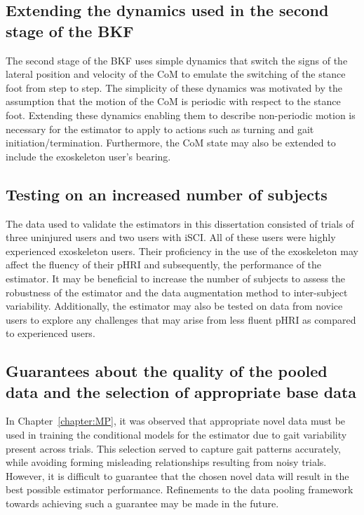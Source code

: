 \subsection{Extending the dynamics used in the second stage of the BKF}

The second stage of the BKF uses simple dynamics that switch the signs of the lateral position and velocity of the CoM to emulate the switching of the stance foot from step to step. The simplicity of these dynamics was motivated by the assumption that the motion of the CoM is periodic with respect to the stance foot. Extending these dynamics enabling them to describe non-periodic motion is necessary for the estimator to apply to actions such as turning and gait initiation/termination. Furthermore, the CoM state may also be extended to include the exoskeleton user's bearing.

\subsection{Testing on an increased number of subjects}

The data used to validate the estimators in this dissertation consisted of trials of three uninjured users and two users with iSCI. All of these users were highly experienced exoskeleton users. Their proficiency in the use of the exoskeleton may affect the fluency of their pHRI and subsequently, the performance of the estimator. It may be beneficial to increase the number of subjects to assess the robustness of the estimator and the data augmentation method to inter-subject variability. Additionally, the estimator may also be tested on data from novice users to explore any challenges that may arise from less fluent pHRI as compared to experienced users.

\subsection{Guarantees about the quality of the pooled data and the selection of appropriate base data}

In Chapter~\ref{chapter:MP}, it was observed that appropriate novel data must be used in training the conditional models for the estimator due to gait variability present across trials. This selection served to capture gait patterns accurately, while avoiding forming misleading relationships resulting from noisy trials. However, it is difficult to guarantee that the chosen novel data will result in the best possible estimator performance. Refinements to the data pooling framework towards achieving such a guarantee may be made in the future.

